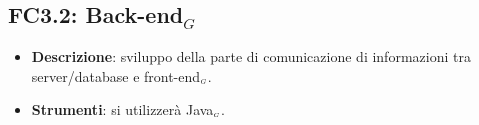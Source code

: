 \subsection{FC3.2: Back-end$_G$}\label{fasiProgettoVisualizzazioneDatiBackEnd}

\begin{itemize}
	\item \textbf{Descrizione}: sviluppo della parte di comunicazione di informazioni tra server/database e front-end$_{\scaleto{G}{3pt}}$.
	\item \textbf{Strumenti}: si utilizzerà Java$_{\scaleto{G}{3pt}}$.
\end{itemize}


